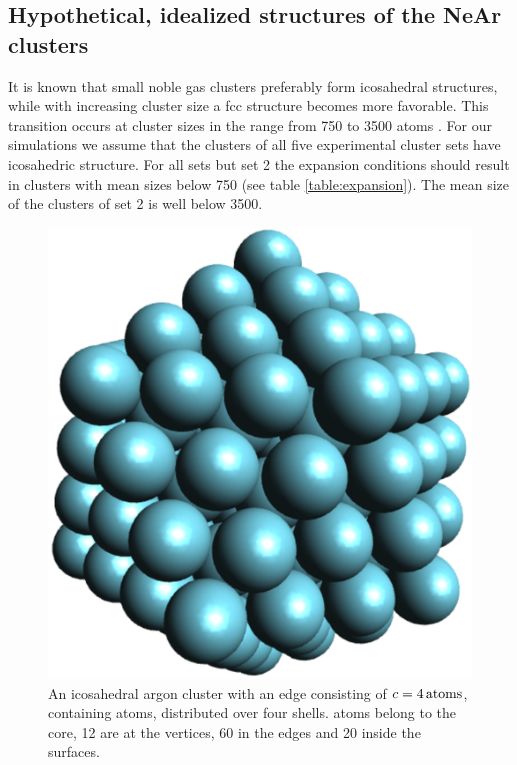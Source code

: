 \subsection{Hypothetical, idealized structures of the NeAr clusters}
\label{chapter_NeArclusters}

It is known that small noble gas clusters preferably form icosahedral structures,
while with increasing cluster size a fcc structure becomes more favorable. This transition
occurs at cluster sizes in the range from 750 to 3500 atoms \cite{Martin96,Doye97,Hartke02}.
For our simulations we assume that the clusters of all five experimental cluster sets have 
icosahedric structure. For all sets but set 2 the expansion conditions should result in clusters 
with mean sizes below 750 (see table \ref{table:expansion}). The mean size of the clusters of set 2 is well below 3500.

\begin{figure}[!ht]
 \centering
 \includegraphics[scale=0.5]{pics/Ar_pure.eps}                        
 \caption{An icosahedral argon cluster with an edge consisting of 
          $c=\unit[4]{atoms}$, containing \unit[147]{atoms},
          distributed over four shells. \unit[55]{atoms} belong
          to the core, 12 are at the vertices, 60 in the edges and 20 inside the
          surfaces.}
 \label{figure:Ar_pure}
\end{figure}    

